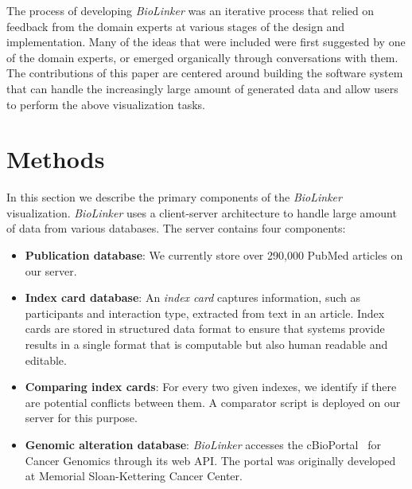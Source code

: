 \documentclass[journal]{vgtc}                %
\newcommand{\theName}{\textit{BioLinker}}
\begin{document}
The process of developing \theName{} was an iterative process that relied on feedback from the domain experts at various stages of the design and implementation. Many of the ideas that were included were first suggested by one of the domain experts, or emerged organically through conversations with them. The contributions of this paper are centered around building the software system that can handle the increasingly large amount of generated data and allow users to perform the above visualization tasks.

\section{Methods}
In this section we describe the primary components of the \theName{} visualization. \theName{} uses a client-server architecture to handle large amount of data from various databases. The server contains four components: 

\begin{itemize}[noitemsep,nolistsep]
\item \textbf{Publication database}: We currently store over 290,000 PubMed articles on our server. %
\item \textbf{Index card database}: An \textit{index card} captures information, such as participants and interaction type, extracted from text in an article. Index cards are stored in structured data format to ensure that systems provide results in a single format that is computable but also human readable and editable. %
\item \textbf{Comparing index cards}: For every two given indexes, we identify if there are potential conflicts between them. A comparator script is deployed on our server for this purpose. %
\item \textbf{Genomic alteration database}: \theName{} accesses the cBioPortal~\cite{cBioPortal2013} for Cancer Genomics through its web API. The portal was originally developed at Memorial Sloan-Kettering Cancer Center. %
\end{itemize}
\end{document}
